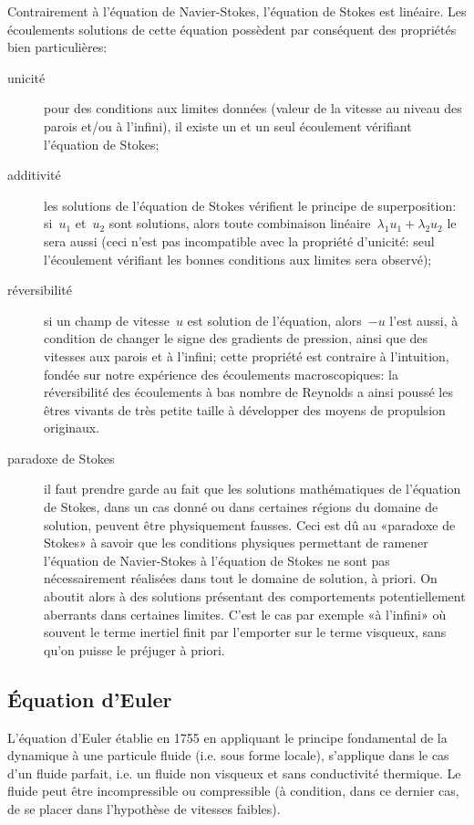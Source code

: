 \medskip
Contrairement à l'équation de Navier-Stokes, l'équation de Stokes est linéaire. Les écoulements solutions de cette équation possèdent par conséquent des propriétés bien particulières:
\begin{description}
  \item[unicité]
	pour des conditions aux limites données (valeur de la vitesse au niveau des parois et/ou à l'infini), il existe un et un seul écoulement vérifiant l'équation de Stokes;
  \item[additivité] 
	les solutions de l'équation de Stokes vérifient le principe de superposition: 
	si~$u_1$ et~$u_2$ sont solutions, alors toute combinaison linéaire~$\lambda_1 u_1 
	+ \lambda_2 u_2$ le sera aussi (ceci n'est pas incompatible avec la propriété d'unicité: seul 
	l'écoulement vérifiant les bonnes conditions aux limites sera observé);
  \item[réversibilité] 
	si un champ de vitesse~$u$ est solution de l'équation, alors~$-u$ l'est aussi, à condition de changer le signe des gradients de pression, ainsi que des vitesses aux parois et à l'infini; cette propriété est contraire à l'intuition, fondée sur notre expérience des écoulements macroscopiques: la réversibilité des écoulements à bas nombre de Reynolds a ainsi poussé les êtres vivants de très petite taille à développer des moyens de propulsion originaux.
  \item[paradoxe de Stokes] 
	il faut prendre garde au fait que les solutions mathématiques de l'équation de Stokes, dans un cas donné ou dans certaines régions du domaine de solution, peuvent être physiquement fausses. Ceci est dû au «paradoxe de Stokes» à savoir que les conditions physiques permettant de ramener l'équation de Navier-Stokes à l'équation de Stokes ne sont pas nécessairement réalisées dans tout le domaine de solution, à priori. 
	On aboutit alors à des solutions présentant des comportements potentiellement aberrants dans certaines limites. C'est le cas par exemple «à l'infini» où souvent le terme inertiel finit par l'emporter sur le terme visqueux, sans qu'on puisse le préjuger à priori.
\end{description}




\medskip
\subsection{Équation d'Euler}


L'équation d'Euler établie en 1755 en appliquant le principe fondamental de la dynamique à une particule fluide (i.e. sous forme locale), s'applique dans le cas d'un fluide parfait, i.e. un fluide non visqueux et sans conductivité thermique. Le fluide peut être incompressible ou compressible (à condition, dans ce dernier cas, de se placer dans l'hypothèse de vitesses faibles). 

